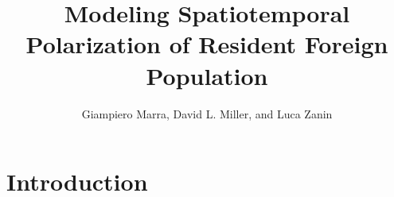 \documentclass[10pt] {article}
\theoremstyle{definition}
\theoremstyle{plain}
\begin{document}
\title{Modeling Spatiotemporal Polarization of Resident Foreign Population}

\author{Giampiero Marra, David L. Miller, and Luca Zanin
}

\maketitle








\section{Introduction \label{IN}}
\end{document}
